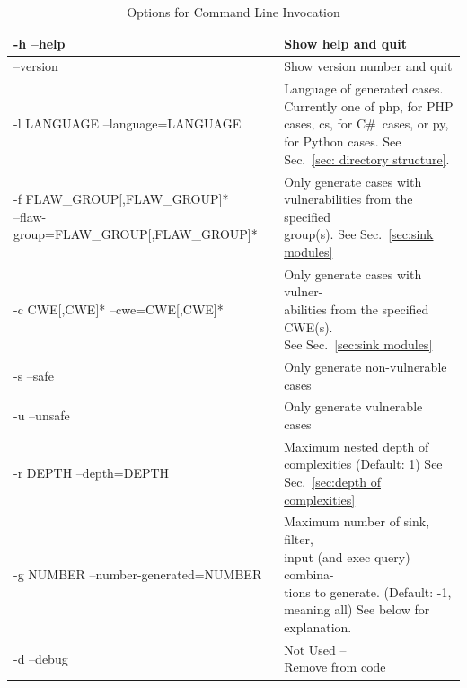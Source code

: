 \documentclass[12pt]{article}
\newcommand{\CSharp}{C{\fontseries{b}\selectfont\#}}
\begin{document}
\begin{table}[H]
\centering
\begin{tabular}{|l|l|}
\hline
-h --help & Show help and quit \\
\hline
--version & Show version number and quit \\
\hline
-l LANGUAGE 
--language=LANGUAGE &
\makecell[l]{Language of generated cases. \\
Currently one of php, for PHP \\
cases, cs, for \CSharp\ cases, or py, \\
for Python cases. 
See Sec.~\ref{sec: directory structure}.} \\
\hline
\makecell[l]{-f FLAW\_GROUP[,FLAW\_GROUP]* \\
--flaw-group=FLAW\_GROUP[,FLAW\_GROUP]*} &
\makecell[l]{Only generate cases with \\
vulnerabilities from the specified \\
group(s). See Sec.~\ref{sec:sink modules}} \\
\hline
-c CWE[,CWE]*
--cwe=CWE[,CWE]* &
\makecell[l]{Only generate cases with vulner- \\
abilities from the specified CWE(s). \\
See Sec.~\ref{sec:sink modules}} \\
\hline
-s
--safe & 
Only generate non-vulnerable cases \\
\hline
-u
--unsafe & 
Only generate vulnerable cases \\
\hline
-r DEPTH
--depth=DEPTH &
\makecell[l]{Maximum nested depth of \\
complexities (Default: 1) See \\ 
Sec.~\ref{sec:depth of complexities}} \\
\hline
-g NUMBER
--number-generated=NUMBER &
\makecell[l]{Maximum number of sink, filter, \\
input (and exec query) combina- \\
tions to generate. (Default: -1, \\
meaning all) See below for \\
explanation.} \\
\hline
-d
--debug &
\makecell[l]{{\Large Not Used --} \\
{\Large Remove from code}} \\
\hline
\end{tabular}
\caption{Options for Command Line Invocation}
\label{tab:command line options}
\end{table} 
\end{document}
